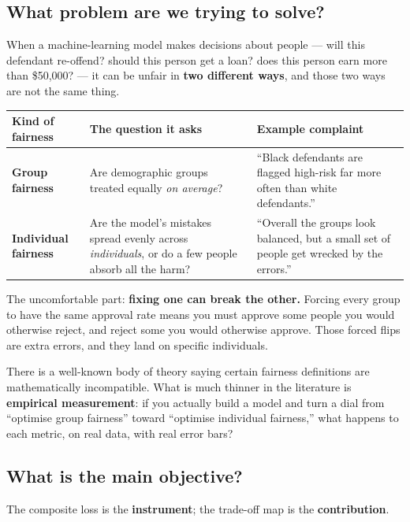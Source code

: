 \documentclass[11pt,a4paper]{article}
\begin{document}
\subsection{What problem are we trying to solve?}

When a machine-learning model makes decisions about people --- will this
defendant re-offend? should this person get a loan? does this person earn more
than \$50{,}000? --- it can be unfair in \textbf{two different ways}, and
those two ways are not the same thing.

\begin{center}
\small
\begin{tabular}{@{}p{}p{}p{}@{}}
\toprule
\textbf{Kind of fairness} & \textbf{The question it asks} & \textbf{Example complaint} \\
\midrule
\textbf{Group fairness} &
Are demographic groups treated equally \emph{on average}? &
``Black defendants are flagged high-risk far more often than white defendants.'' \\
\addlinespace
\textbf{Individual fairness} &
Are the model's mistakes spread evenly across \emph{individuals}, or do a few
people absorb all the harm? &
``Overall the groups look balanced, but a small set of people get wrecked by
the errors.'' \\
\bottomrule
\end{tabular}
\end{center}

The uncomfortable part: \textbf{fixing one can break the other.} Forcing every
group to have the same approval rate means you must approve some people you
would otherwise reject, and reject some you would otherwise approve. Those
forced flips are extra errors, and they land on specific individuals.

There is a well-known body of theory saying certain fairness definitions are
mathematically incompatible. What is much thinner in the literature is
\textbf{empirical measurement}: if you actually build a model and turn a dial
from ``optimise group fairness'' toward ``optimise individual fairness,'' what
happens to each metric, on real data, with real error bars?

\subsection{What is the main objective?}

\begin{keybox}
The composite loss is the \textbf{instrument}; the trade-off map is the
\textbf{contribution}.
\end{keybox}
\end{document}
